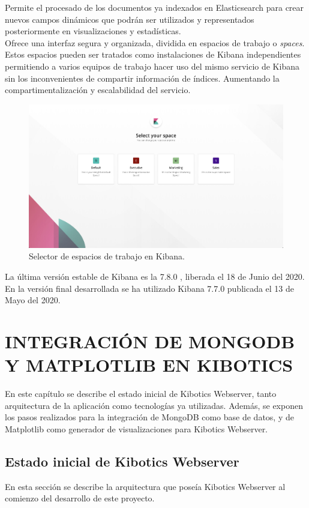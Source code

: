 \documentclass[11pt,a4paper]{book}
\begin{document}
				Permite el procesado de los documentos ya indexados en Elasticsearch para crear nuevos campos dinámicos que podrán ser utilizados y representados posteriormente en visualizaciones y estadísticas.\\
								
				Ofrece una interfaz segura y organizada, dividida en espacios de trabajo o \textit{spaces}. Estos espacios pueden ser tratados como instalaciones de Kibana independientes permitiendo a varios equipos de trabajo hacer uso del mismo servicio de Kibana sin los inconvenientes de compartir información de índices. Aumentando la compartimentalización y escalabilidad del servicio.
				
				\begin{figure}[H]
					\centering
					\includegraphics[width=12cm, keepaspectratio]{img/spaces_kibana.jpg}
					\caption{Selector de espacios de trabajo en Kibana.}
					\label{fig:spaces_kibana}
				\end{figure}
				
				La última versión estable de Kibana es la 7.8.0 \cite{versions_kibana}, liberada el 18 de Junio del 2020. En la versión final desarrollada se ha utilizado Kibana 7.7.0 publicada el 13 de Mayo del 2020.


				
	\chapter{INTEGRACIÓN DE MONGODB Y MATPLOTLIB EN KIBOTICS}
		En este capítulo se describe el estado inicial de Kibotics Webserver, tanto arquitectura de la aplicación como tecnologías ya utilizadas. Además, se exponen los pasos realizados para la integración de MongoDB como base de datos, y de Matplotlib como generador de visualizaciones para Kibotics Webserver.
		
		\section{Estado inicial de Kibotics Webserver}
			En esta sección se describe la arquitectura que poseía Kibotics Webserver al comienzo del desarrollo de este proyecto.
\end{document}
